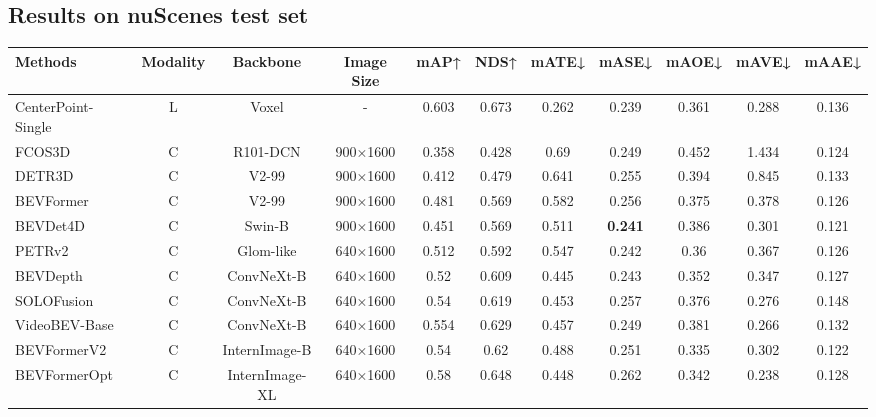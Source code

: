 \documentclass[10pt,twocolumn,letterpaper]{article}
\begin{document}
\subsection{Results on nuScenes test set}
\begin{table*}[h]\footnotesize
\centering
\vspace{0em} 
\setlength{\tabcolsep}{1mm}
\begin{tabular}{@{}lcccccccccc@{}}
\hline
Methods                     & Modality & Backbone       & Image Size & mAP↑  & NDS↑           & mATE↓ & mASE↓ & mAOE↓ & mAVE↓ & mAAE↓ \\ 
\hline
CenterPoint-Single & L     & Voxel          & -        & 0.603          & 0.673          & 0.262  & 0.239 & 0.361          & 0.288  & 0.136 \\\hline
{FCOS3D}             & C   & R101-DCN       & 900×1600 & 0.358          & 0.428          & 0.69   & 0.249 & 0.452          & 1.434  & 0.124 \\
{DETR3D}             & C   & V2-99          & 900×1600 & 0.412          & 0.479          & 0.641  & 0.255 & 0.394          & 0.845  & 0.133 \\ 
{BEVFormer}          & C   & V2-99          & 900×1600 & 0.481          & 0.569          & 0.582  & 0.256 & 0.375          & 0.378  & 0.126 \\
{BEVDet4D}           & C   & Swin-B         & 900×1600 & 0.451          & 0.569          & 0.511  & \textbf{0.241}& 0.386  & 0.301  & 0.121 \\
{PETRv2}             & C   & Glom-like      & 640×1600 & 0.512          & 0.592          & 0.547  & 0.242 & 0.36           & 0.367  & 0.126 \\
{BEVDepth}           & C   & ConvNeXt-B     & 640×1600 & 0.52           & 0.609          & 0.445  & 0.243 & 0.352          & 0.347  & 0.127 \\
{SOLOFusion}         & C   & ConvNeXt-B     & 640×1600 & 0.54           & 0.619          & 0.453  & 0.257 & 0.376          & 0.276  & 0.148 \\
{VideoBEV-Base}      & C   & ConvNeXt-B     & 640×1600 & 0.554          & 0.629          & 0.457  & 0.249 & 0.381          & 0.266  & 0.132 \\
{BEVFormerV2}        & C   & InternImage-B  & 640×1600 & 0.54           & 0.62           & 0.488  & 0.251 & 0.335          & 0.302  & 0.122 \\
{BEVFormerOpt}       & C   & InternImage-XL & 640×1600 & 0.58           & 0.648          & 0.448  & 0.262 & 0.342          & 0.238  & 0.128 \\

\end{tabular}
\end{table*}
\end{document}
